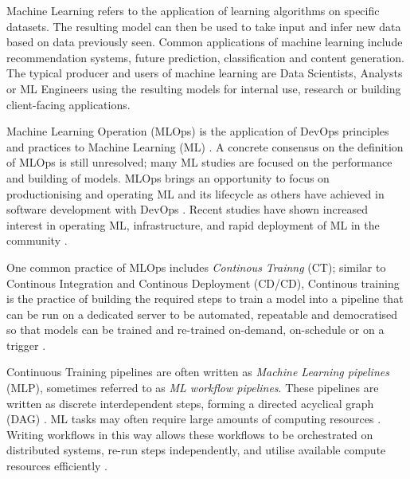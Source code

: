 \documentclass[12pt]{article}
\begin{document}
Machine Learning refers to the application of learning algorithms on specific datasets. The resulting model can then be used to take input and infer new data based on data previously seen. Common applications of machine learning include recommendation systems, future prediction, classification and content generation. The typical producer and users of machine learning are Data Scientists, Analysts or ML Engineers using the resulting models for internal use, research or building client-facing applications. \citep{polyzotisDataManagementChallenges2017, helmMachineLearningArtificial2020}

Machine Learning Operation (MLOps) is the application of DevOps principles and practices to Machine Learning (ML) \citep{kreuzbergerMachineLearningOperations2022, shankarOperationalizingMachineLearning2022, zhouMLOpsCaseStudy2020}. A concrete consensus on the definition of MLOps is still unresolved; many ML studies are focused on the performance and building of models. MLOps brings an opportunity to focus on productionising and operating ML and its lifecycle as others have achieved in software development with DevOps \citep{kreuzbergerMachineLearningOperations2022, shankarOperationalizingMachineLearning2022}. Recent studies have shown increased interest in operating ML, infrastructure, and rapid deployment of ML in the community \citep{makinenWhoNeedsMLOps2021}.

One common practice of MLOps includes \textit{Continous Trainng} (CT); similar to Continous Integration and Continous Deployment (CD/CD), Continous training is the practice of building the required steps to train a model into a pipeline that can be run on a dedicated server to be automated, repeatable and democratised so that models can be trained and re-trained on-demand, on-schedule or on a trigger \citep{humbleContinuousDeliveryReliable2010, kimPhoenixProjectNovel2018, googleMLOpsContinuousDelivery2023, giftPracticalMLOpsOperationalizing2021, zhouMLOpsCaseStudy2020}.

Continuous Training pipelines are often written as \textit{Machine Learning pipelines} (MLP), sometimes referred to as \textit{ML workflow pipelines}. These pipelines are written as discrete interdependent steps, forming a directed acyclical graph (DAG) \citep{muiruriPracticesInfrastructuresMachine2022, zhouMLOpsCaseStudy2020}. ML tasks may often require large amounts of computing resources \citep{tuulosEffectiveDataScience2022, muiruriPracticesInfrastructuresMachine2022}. Writing workflows in this way allows these workflows to be orchestrated on distributed systems, re-run steps independently, and utilise available compute resources efficiently \citep{fowlerContinuousDeliveryMachine2019, muiruriPracticesInfrastructuresMachine2022}.
\end{document}
